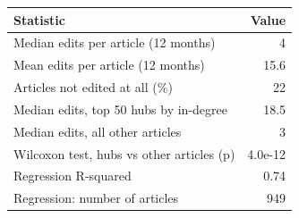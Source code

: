 
\begin{tabular}{lr}
\toprule
Statistic & Value\\
\midrule
Median edits per article (12 months) & 4\\
Mean edits per article (12 months) & 15.6\\
Articles not edited at all (\%) & 22\\
Median edits, top 50 hubs by in-degree & 18.5\\
Median edits, all other articles & 3\\
Wilcoxon test, hubs vs other articles (p) & 4.0e-12\\
Regression R-squared & 0.74\\
Regression: number of articles & 949\\
\bottomrule
\end{tabular}
